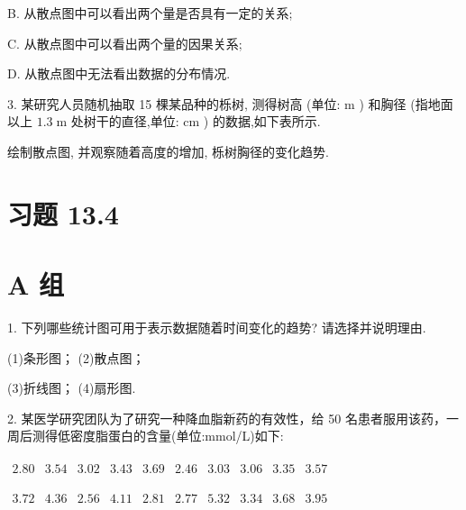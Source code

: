 \documentclass[10pt]{article}
\begin{document}
B. 从散点图中可以看出两个量是否具有一定的关系;

C. 从散点图中可以看出两个量的因果关系;

D. 从散点图中无法看出数据的分布情况.

3. 某研究人员随机抽取 15 棵某品种的栎树, 测得树高 (单位: \(\mathrm{m}\) ) 和胸径 (指地面以上 \({1.3}\mathrm{\;m}\) 处树干的直径,单位: \(\mathrm{{cm}}\) ) 的数据,如下表所示.

\begin{center}
\end{center}

绘制散点图, 并观察随着高度的增加, 栎树胸径的变化趋势.

\section*{习题 13.4}

\section*{A 组}

1. 下列哪些统计图可用于表示数据随着时间变化的趋势? 请选择并说明理由.

(1)条形图； (2)散点图；

(3)折线图； (4)扇形图.

2. 某医学研究团队为了研究一种降血脂新药的有效性，给 50 名患者服用该药，一周后测得低密度脂蛋白的含量(单位:mmol/L)如下:

\(\begin{array}{llllllllll} {2.80} & {3.54} & {3.02} & {3.43} & {3.69} & {2.46} & {3.03} & {3.06} & {3.35} & {3.57} \end{array}\)

\(\begin{array}{llllllllll} {3.72} & {4.36} & {2.56} & {4.11} & {2.81} & {2.77} & {5.32} & {3.34} & {3.68} & {3.95} \end{array}\)
\end{document}
